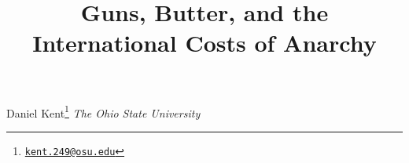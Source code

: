 \documentclass[12pt]{article}
\title{Guns, Butter, and the International Costs of Anarchy} %
\date{}
\renewenvironment{abstract}
{{%
\setlength{\leftmargin}{0mm}
    \setlength{\rightmargin}{\leftmargin}%
}%
\relax}
{\endlist}
\begin{document}

{%
\setlength{\parindent}{0pt}
\thispagestyle{plain}
{\fontsize{20}{22}\selectfont\raggedright
\maketitle  %

}

{
\vskip 13.5pt\relax \normalsize
Daniel Kent\footnote{\href{mailto:kent.249@osu.edu}{\nolinkurl{kent.249@osu.edu}}}
\hskip 15pt \emph{\small \textit{The Ohio State University}}
}

}


\begin{abstract}

    \hbox{\vrule height .2pt width 39.14pc}

    \vskip 8.5pt %



\end{abstract}
\end{document}
